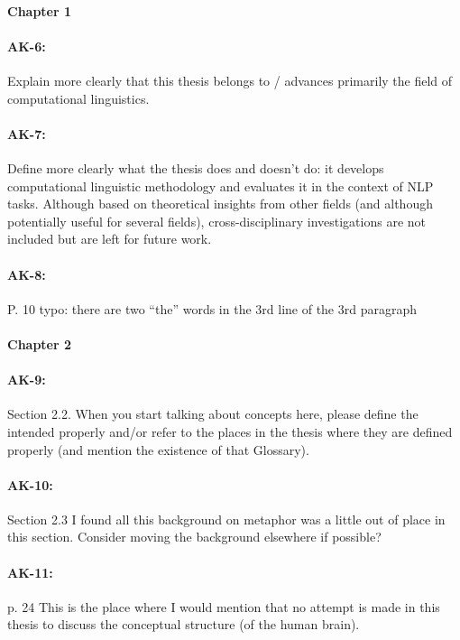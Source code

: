 \documentclass[11pt,a4paper]{article}
\begin{document}
\paragraph{Chapter 1}

\paragraph{AK-6:} Explain more clearly that this thesis belongs to / advances primarily the field of computational linguistics.

\paragraph{AK-7:} Define more clearly what the thesis does and doesn’t do: it develops computational linguistic methodology and evaluates it in the context of NLP tasks. Although based on theoretical insights from other fields (and although potentially useful for several fields), cross-disciplinary investigations are not included but are left for future work.

\paragraph{AK-8:} P. 10 typo: there are two “the” words in the 3rd line of the 3rd paragraph

\paragraph{Chapter 2}

\paragraph{AK-9:} Section 2.2. When you start talking about concepts here, please define the intended properly and/or refer to the places in the thesis where they are defined properly (and mention the existence of that Glossary).

\paragraph{AK-10:} Section 2.3 I found all this background on metaphor was a little out of place in this section. Consider moving the background elsewhere if possible?

\paragraph{AK-11:} p. 24 This is the place where I would mention that no attempt is made in this thesis to discuss the conceptual structure (of the human brain).
\end{document}
